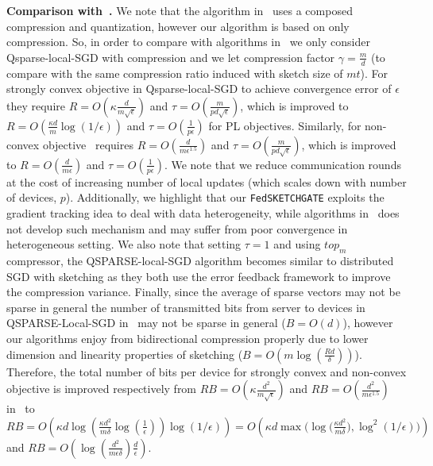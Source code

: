 \documentclass{article}
\begin{document}
\noindent\textbf{Comparison with~\citet{basu2019qsparse}.}  We note that the algorithm in~\cite{basu2019qsparse} uses a composed compression and quantization, however our algorithm is based on only compression. So, in order to compare with algorithms in~\cite{basu2019qsparse} we only consider Qsparse-local-SGD with compression and we let compression factor $\gamma=\frac{m}{d}$ (to compare with the same compression ratio induced with sketch size of $mt$). For strongly convex objective in   Qsparse-local-SGD to achieve convergence error of $\epsilon$ they require $R=O\left(\kappa\frac{d}{m\sqrt{\epsilon}}\right)$ and $\tau=O\left(\frac{m}{pd\sqrt{\epsilon}}\right)$, which is improved to $R=O\left(\frac{\kappa d}{m}\log (1/\epsilon)\right)$ and $\tau=O\left(\frac{1}{p\epsilon}\right)$ for PL \:   objectives. Similarly, for non-convex objective~\cite{basu2019qsparse} requires $R=O\left(\frac{d}{m\epsilon^{1.5}}\right)$ and $\tau=O\left(\frac{m}{pd\sqrt{\epsilon}}\right)$, which is improved to $R=O\left(\frac{d}{m\epsilon}\right)$ and $\tau=O\left(\frac{1}{p\epsilon}\right)$. We note that we reduce communication rounds at the cost of increasing number of local updates (which scales down with number of devices, $p$). Additionally, we highlight that our \texttt{FedSKETCHGATE} exploits the gradient tracking idea to deal with data heterogeneity, while algorithms in~\cite{basu2019qsparse} does not develop such mechanism and may suffer from poor convergence in heterogeneous setting. We also note that setting $\tau=1$ and using $top_{m}$ compressor, the QSPARSE-local-SGD algorithm becomes similar to distributed SGD with sketching as they both use the error feedback framework to improve the compression variance.  
Finally, since the average of sparse vectors may not be sparse in general the number of transmitted bits from server to devices in QSPARSE-Local-SGD in~\cite{basu2019qsparse} may not be sparse in general ($B=O(d)$), however our algorithms enjoy from bidirectional compression properly due to lower dimension and linearity properties of sketching ($B=O(m\log(\frac{Rd}{\delta}))$). Therefore, the total number of bits per device for strongly convex and non-convex objective is improved respectively from $RB=O\left(\kappa\frac{d^2}{m\sqrt{\epsilon}}\right)$ and $RB=O\left(\frac{d^2}{m\epsilon^{1.5}}\right)$ in~\cite{basu2019qsparse} to $RB=O\left({\kappa d\log(\frac{\kappa d^2}{m\delta}\log (\frac{1}{\epsilon})) }\log (1/\epsilon)\right)=O\left({\kappa d\max\Big(\log(\frac{\kappa d^2}{m\delta}}),\log^2 (1/\epsilon)\Big)\right)$ and $RB=O\left(\log(\frac{d^2}{m\epsilon\delta})\frac{d}{\epsilon}\right)$.
\end{document}
